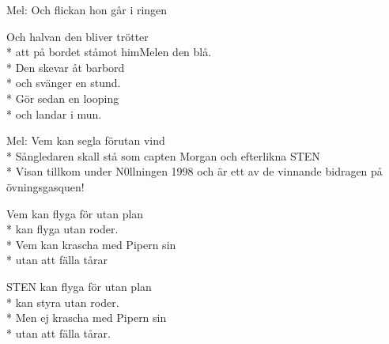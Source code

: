 \begin{SongText}[Flygarhalvan]
    \begin{SongInfo}
        Mel: Och flickan hon går i ringen
    \end{SongInfo}
    \begin{SongVerse}
        Och halvan den bliver trötter\\*%
        att på bordet ståmot himMelen den blå.\\*%
        Den skevar åt barbord\\*%
        och svänger en stund.\\*%
        Gör sedan en looping\\*%
        och landar i mun.
    \end{SongVerse}
\end{SongText}

\begin{SongText}[Sten]
    \begin{SongInfo}
        Mel: Vem kan segla förutan vind\\*%
        Sångledaren skall stå som capten Morgan och efterlikna STEN\\*%
        Visan tillkom under N0llningen 1998 och är ett av de vinnande bidragen på övningsgasquen!
    \end{SongInfo}
    \begin{SongVerse}
        Vem kan flyga för utan plan\\*%
        kan flyga utan roder.\\*%
        Vem kan krascha med Pipern sin\\*%
        utan att fälla tårar
    \end{SongVerse}
    \begin{SongVerse}
        STEN kan flyga för utan plan\\*%
        kan styra utan roder.\\*%
        Men ej krascha med Pipern sin\\*%
        utan att fälla tårar.
    \end{SongVerse}
\end{SongText}

